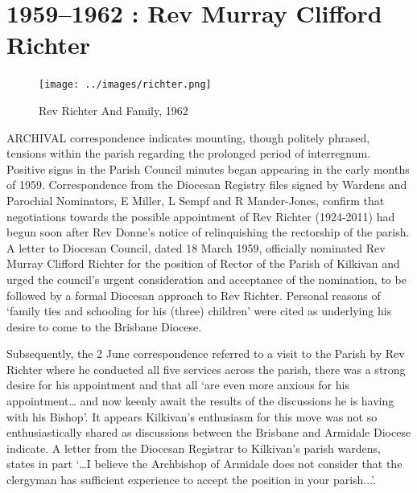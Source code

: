 \balance


\printendnotes[custom]
\setcounter{endnote}{0}
\chapter{1959--1962 : Rev Murray Clifford Richter}
\nobalance








\begin{figure}
\begin{center}
\texttt{[image: ../images/richter.png]}
\caption{Rev Richter And Family, 1962}
\end{center}
\end{figure}




\lettrine[lines=3]{A}{RCHIVAL}
 correspondence indicates mounting, though politely phrased, tensions within the parish regarding the prolonged period of interregnum. Positive signs in the Parish Council minutes began appearing in the early months of 1959. Correspondence from the Diocesan Registry files signed by Wardens and Parochial Nominators, E Miller, L Sempf and R Mander-Jones, confirm that negotiations towards the possible appointment of Rev Richter (1924-2011) had begun soon after Rev Donne's notice of relinquishing the rectorship of the parish. A letter to Diocesan Council, dated 18 March 1959, officially nominated Rev Murray Clifford Richter for the position of Rector of the Parish of Kilkivan and urged the council's urgent consideration and acceptance of the nomination, to be followed by a formal Diocesan approach to Rev Richter. Personal reasons of `family ties and schooling for his (three) children' were cited as underlying his desire to come to the Brisbane Diocese.

Subsequently, the 2 June correspondence referred to a visit to the Parish by Rev Richter where he conducted all five services across the parish, there was a strong desire for his appointment and that all `are even more anxious for his appointment\ldots{} and now keenly await the results of the discussions he is having with his Bishop'. It appears Kilkivan's enthusiasm for this move was not so enthusiastically shared as discussions between the Brisbane and Armidale Diocese indicate. A letter from the Diocesan Registrar to Kilkivan's parish wardens, states in part `\ldots I believe the Archbishop of Armidale does not consider that the clergyman has sufficient experience to accept the position in your parish...'.



